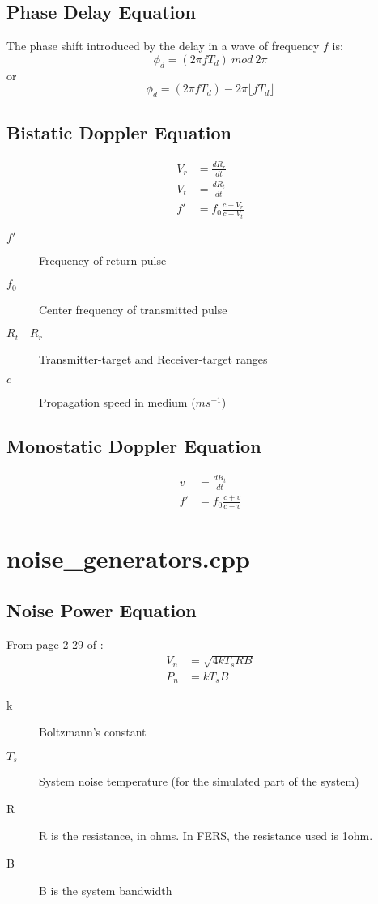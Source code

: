 \documentclass[a4paper,10pt]{article}
\begin{document}
\subsection{Phase Delay Equation}\label{phase}
The phase shift introduced by the delay in a wave of frequency $f$ is:
\begin{equation}
\phi_d = (2\pi f T_d)~{mod}~2\pi
\end{equation}
or
\begin{equation}
\phi_d = (2\pi f T_d) - 2\pi \lfloor f T_d \rfloor
\end{equation}

\subsection{Bistatic Doppler Equation}
\begin{align}
V_r &= \frac{dR_r}{dt}\\
V_t &= \frac{dR_t}{dt}\\
f' &= f_0 \frac{c+V_r}{c-V_t}
\end{align}
\begin{description}
 \item[$f'$] Frequency of return pulse
\item[$f_0$] Center frequency of transmitted pulse
\item[$R_t \quad R_r$] Transmitter-target and Receiver-target ranges
\item[$c$] Propagation speed in medium ($ms^{-1}$)
\end{description}

\subsection{Monostatic Doppler Equation}
\begin{align}
v &= \frac{dR_t}{dt} \\
f' &= f_0 \frac{c+v}{c-v}
\end{align}

\section {noise_generators.cpp}

\subsection{Noise Power Equation}
From page 2-29 of \cite{skolnik70}:
\begin{align}
V_n &= \sqrt{4k T_s RB} \\
P_n &= k T_s B
\end{align}
\begin{description}
 \item[k] Boltzmann's constant
\item[$T_s$] System noise temperature (for the simulated part of the system)
\item[R] R is the resistance, in ohms. In FERS, the resistance used is 1ohm.
\item[B] B is the system bandwidth
\end{description}
\end{document}
